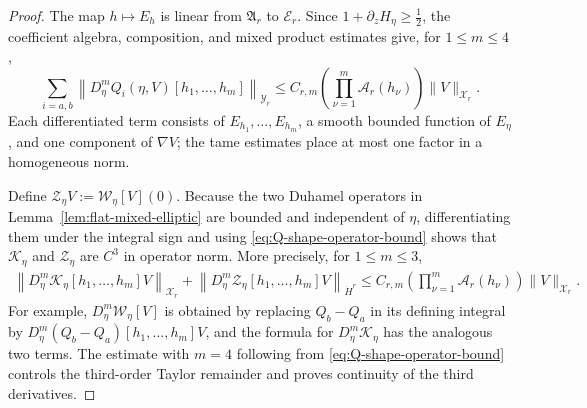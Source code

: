 \documentclass[10pt,a4paper]{amsart}
\begin{document}
\begin{proof}
The map \(h\mapsto E_h\) is linear from \(\mathfrak A_r\) to \(\mathcal E_r\).  
Since \(1+\partial_zH_\eta\geq\frac12\), the coefficient algebra, composition, and mixed product estimates give, for
\(1\leq m\leq4\),
\begin{equation}
\label{eq:Q-shape-operator-bound}
 \sum_{i = a, b}\left\| D_\eta^mQ_i(\eta,V) [h_1,\ldots,h_m] \right\|_{\mathcal Y_r}\leq C_{r,m} \left( \prod_{\nu=1}^m \mathcal A_r(h_\nu) \right) \|V\|_{\mathcal X_r}.
\end{equation}
Each differentiated term consists of \(E_{h_1},\ldots,E_{h_m}\), a smooth bounded function of \(E_\eta\), and one component of \(\nabla V\);
the tame estimates place at most one factor in a homogeneous norm.

Define \(\mathcal Z_\eta V:=\mathcal W_\eta[V](0)\).
Because the two Duhamel operators in Lemma~\ref{lem:flat-mixed-elliptic} are bounded and independent of \(\eta\), differentiating them under the integral sign and using
\eqref{eq:Q-shape-operator-bound} shows that \(\mathcal K_\eta\) and \(\mathcal Z_\eta\) are \(C^3\) in operator norm.  
More precisely, for
\(1\leq m\leq3\),
\begin{equation}
\label{eq:K-shape-bound}
\begin{aligned}
 \left\| D_\eta^m\mathcal K_\eta [h_1,\ldots,h_m]V \right\|_{\mathcal X_r}+ \left\| D_\eta^m\mathcal Z_\eta [h_1,\ldots,h_m]V \right\|_{\dot H^r}\leq C_{r,m} \left( \prod_{\nu=1}^m \mathcal A_r(h_\nu) \right) \|V\|_{\mathcal X_r}.
\end{aligned}
\end{equation}
For example, \(D_\eta^m\mathcal W_\eta[V]\) is obtained by replacing \(Q_b-Q_a\) in its defining integral by \(D_\eta^m(Q_b-Q_a)[h_1,\ldots,h_m]V\), and the formula for
\(D_\eta^m\mathcal K_\eta\) has the analogous two terms.  
The estimate with \(m=4\) following from \eqref{eq:Q-shape-operator-bound} controls the third-order Taylor remainder and proves continuity of the third derivatives.


\end{proof}
\end{document}

